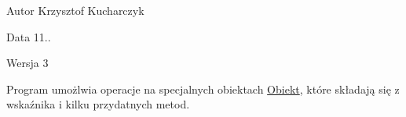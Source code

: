 \begin{DoxyAuthor}{\-Autor}
\-Krzysztof \-Kucharczyk 
\end{DoxyAuthor}
\begin{DoxyDate}{\-Data}
11.. 
\end{DoxyDate}
\begin{DoxyVersion}{\-Wersja}
3
\end{DoxyVersion}
\-Program umożlwia operacje na specjalnych obiektach \hyperlink{class_obiekt}{\-Obiekt}, które składają się z wskaźnika i kilku przydatnych metod. 